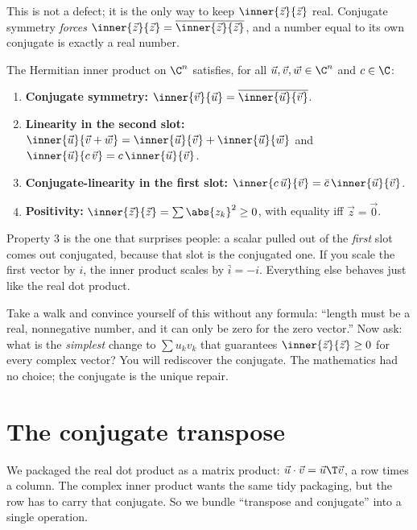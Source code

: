 This is not a defect; it is the only way to keep $\inner{\vec z}{\vec z}$ real.
Conjugate symmetry \emph{forces} $\inner{\vec z}{\vec z} = \overline{\inner{\vec
z}{\vec z}}$, and a number equal to its own conjugate is exactly a real number.

\begin{formalbox}
The Hermitian inner product on $\C^n$ satisfies, for all $\vec u,\vec v,\vec w\in
\C^n$ and $c\in\C$:
\begin{enumerate}
  \item \textbf{Conjugate symmetry:} $\inner{\vec v}{\vec u} =
        \overline{\inner{\vec u}{\vec v}}$.
  \item \textbf{Linearity in the second slot:} $\inner{\vec u}{\vec v + \vec w} =
        \inner{\vec u}{\vec v} + \inner{\vec u}{\vec w}$ and
        $\inner{\vec u}{c\,\vec v} = c\,\inner{\vec u}{\vec v}$.
  \item \textbf{Conjugate-linearity in the first slot:}
        $\inner{c\,\vec u}{\vec v} = \bar c\,\inner{\vec u}{\vec v}$.
  \item \textbf{Positivity:} $\inner{\vec z}{\vec z} = \sum\abs{z_k}^2 \ge 0$, with
        equality iff $\vec z = \vec 0$.
\end{enumerate}
\end{formalbox}

Property 3 is the one that surprises people: a scalar pulled out of the
\emph{first} slot comes out conjugated, because that slot is the conjugated one.
If you scale the first vector by $i$, the inner product scales by $\bar i = -i$.
Everything else behaves just like the real dot product.

\begin{walkbox}
Take a walk and convince yourself of this without any formula: ``length must be a
real, nonnegative number, and it can only be zero for the zero vector.'' Now ask:
what is the \emph{simplest} change to $\sum u_kv_k$ that guarantees
$\inner{\vec z}{\vec z}\ge 0$ for every complex vector? You will rediscover the
conjugate. The mathematics had no choice; the conjugate is the unique repair.
\end{walkbox}

\section{The conjugate transpose}

We packaged the real dot product as a matrix product: $\vec u\cdot\vec v =
\vec u\T\vec v$, a row times a column. The complex inner product wants the same
tidy packaging, but the row has to carry that conjugate. So we bundle ``transpose
and conjugate'' into a single operation.

